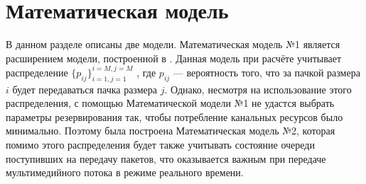 \section{Математическая модель}
\label{sec:math_model}

В данном разделе описаны две модели. Математическая модель №1 является расширением модели, построенной в \cite{ivanov2014mccablockack}. Данная модель при расчёте учитывает распределение $\{ p_{ij} \}_{i=1, j=1}^{i=M, j=M}$ , где $p_{ij}$ --- вероятность того, что за пачкой размера $i$ будет передаваться пачка размера $j$. Однако, несмотря на использование этого распределения, с помощью Математической модели №1 не удастся выбрать параметры резервирования так, чтобы потребление канальных ресурсов было минимально.
Поэтому была построена Математическая модель №2, которая помимо этого распределения будет также учитывать состояние очереди поступивших на передачу пакетов, что оказывается важным при передаче мультимедийного потока в режиме реального времени.





%
%

